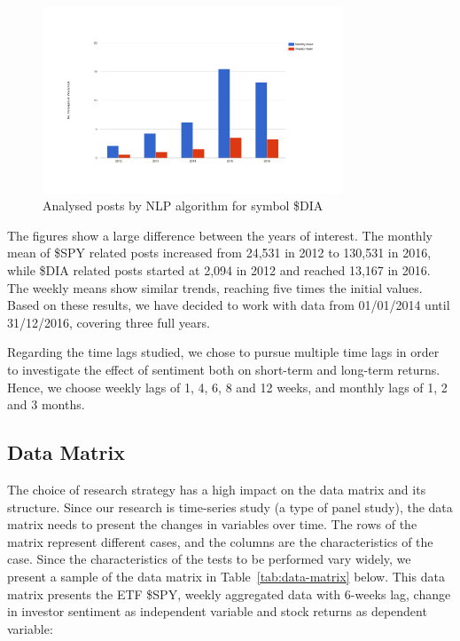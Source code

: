 \begin{figure}[ht]
\centering
\caption{\label{fig:msg_dia_agg}Analysed posts by NLP algorithm for symbol \$DIA}
\includegraphics[width=0.8\textwidth]{figures/msg_dia_agg.png}
\end{figure}

The figures show a large difference between the years of interest. The monthly mean of \$SPY related posts increased from 24,531 in 2012 to 130,531 in 2016, while \$DIA related posts started at 2,094 in 2012 and reached 13,167 in 2016. The weekly means show similar trends, reaching five times the initial values. Based on these results, we have decided to work with data from 01/01/2014 until 31/12/2016, covering three full years.
\par
Regarding the time lags studied, we chose to pursue multiple time lags in order to investigate the effect of sentiment both on short-term and long-term returns. Hence, we choose weekly lags of 1, 4, 6, 8 and 12 weeks, and monthly lags of 1, 2 and 3 months.

\subsection{Data Matrix}
The choice of research strategy has a high impact on the data matrix and its structure. Since our research is time-series study (a type of panel study), the data matrix needs to present the changes in variables over time. The rows of the matrix represent different cases, and the columns are the characteristics of the case. Since the characteristics of the tests to be performed vary widely, we present a sample of the data matrix in Table~\ref{tab:data-matrix} below. This data matrix presents the ETF \$SPY, weekly aggregated data with 6-weeks lag, change in investor sentiment as independent variable and stock returns as dependent variable:

